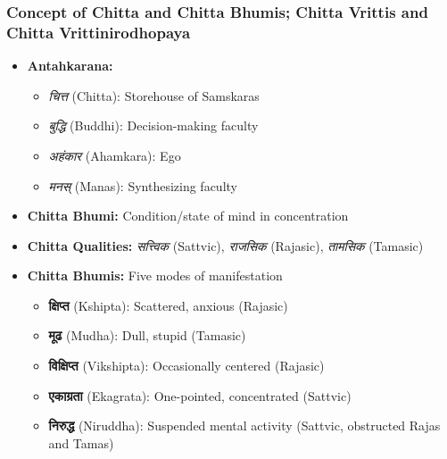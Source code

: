 \begin{frame}[fragile]\frametitle{Concept of Chitta and Chitta Bhumis; Chitta Vrittis and Chitta Vrittinirodhopaya}

    \begin{itemize}
        \item \textbf{Antahkarana:} 
        \begin{itemize}
            \item \textit{चित्त} (Chitta): Storehouse of Samskaras
            \item \textit{बुद्धि} (Buddhi): Decision-making faculty
            \item \textit{अहंकार} (Ahamkara): Ego
            \item \textit{मनस्} (Manas): Synthesizing faculty
        \end{itemize}
        \item \textbf{Chitta Bhumi:} Condition/state of mind in concentration
        \item \textbf{Chitta Qualities:} \textit{सत्त्विक} (Sattvic), \textit{राजसिक} (Rajasic), \textit{तामसिक} (Tamasic)
        \item \textbf{Chitta Bhumis:} Five modes of manifestation
        \begin{itemize}
            \item \textbf{क्षिप्त} (Kshipta): Scattered, anxious (Rajasic)
            \item \textbf{मूढ} (Mudha): Dull, stupid (Tamasic)
            \item \textbf{विक्षिप्त} (Vikshipta): Occasionally centered (Rajasic)
            \item \textbf{एकाग्रता} (Ekagrata): One-pointed, concentrated (Sattvic)
            \item \textbf{निरुद्ध} (Niruddha): Suspended mental activity (Sattvic, obstructed Rajas and Tamas)
        \end{itemize}
    \end{itemize}

\end{frame}

